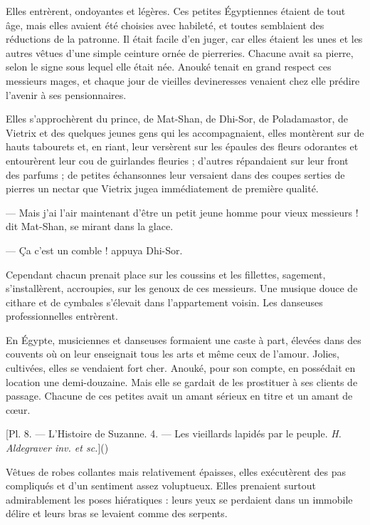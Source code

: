 \documentclass[a4paper, 11pt, oneside, polutonikogreek, french]{article}
\begin{document}
Elles entrèrent, ondoyantes et légères. Ces petites Égyptiennes étaient de tout âge, mais elles avaient été choisies avec habileté, et toutes semblaient des réductions de la patronne. Il était facile d'en juger, car elles étaient les unes et les autres vêtues d'une simple ceinture ornée de pierreries. Chacune avait sa pierre, selon le signe sous lequel elle était née. Anouké tenait en grand respect ces messieurs mages, et chaque jour de vieilles devineresses venaient chez elle prédire l'avenir à ses pensionnaires.

Elles s'approchèrent du prince, de Mat-Shan, de Dhi-Sor, de Poladamastor, de Vietrix et des quelques jeunes gens qui les accompagnaient, elles montèrent sur de hauts tabourets et, en riant, leur versèrent sur les épaules des fleurs odorantes et entourèrent leur cou de guirlandes fleuries ; d'autres répandaient sur leur front des parfums ; de petites échansonnes leur versaient dans des coupes serties de pierres un nectar que Vietrix jugea immédiatement de première qualité.

--- Mais j'ai l'air maintenant d'être un petit jeune homme pour vieux messieurs ! dit Mat-Shan, se mirant dans la glace.

--- Ça c'est un comble ! appuya Dhi-Sor.

\bigskip
\centerline{\EightStarTaper}
\centerline{\EightStarTaper\EightStarTaper}
\bigskip

Cependant chacun prenait place sur les coussins et les fillettes, sagement, s'installèrent, accroupies, sur les genoux de ces messieurs. Une musique douce de cithare et de cymbales s'élevait dans l'appartement voisin. Les danseuses professionnelles entrèrent.

En Égypte, musiciennes et danseuses formaient une caste à part, élevées dans des couvents où on leur enseignait tous les arts et même ceux de l'amour. Jolies, cultivées, elles se vendaient fort cher. Anouké, pour son compte, en possédait en location une demi-douzaine. Mais elle se gardait de les prostituer à ses clients de passage. Chacune de ces petites avait un amant sérieux en titre et un amant de cœur.

[Pl. 8. --- L'Histoire de Suzanne. 4. --- Les vieillards lapidés par le peuple. \emph{H. Aldegraver inv. et sc.}]()

Vêtues de robes collantes mais relativement épaisses, elles exécutèrent des pas compliqués et d'un sentiment assez voluptueux. Elles prenaient surtout admirablement les poses hiératiques : leurs yeux se perdaient dans un immobile délire et leurs bras se levaient comme des serpents.
\end{document}

